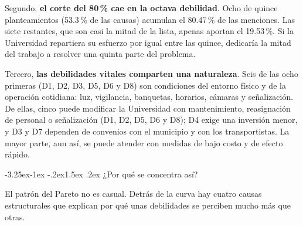 \documentclass[11pt,a4paper]{article}
\makeatletter
\renewcommand\subsection{\@startsection{subsection}{2}{\z@}%
  {-3.25ex\@plus -1ex \@minus -.2ex}{1.5ex \@plus .2ex}%
  {\normalfont\large\bfseries\color{uazblue!85!black}}}
\makeatother
\begin{document}
Segundo, \textbf{el corte del 80\,\% cae en la octava debilidad}. Ocho de
quince planteamientos (53.3\,\% de las causas) acumulan el 80.47\,\% de las
menciones. Las siete restantes, que son casi la mitad de la lista, apenas
aportan el 19.53\,\%. Si la Universidad repartiera su esfuerzo por igual entre
las quince, dedicaría la mitad del trabajo a resolver una quinta parte del
problema.

Tercero, \textbf{las debilidades vitales comparten una naturaleza}. Seis de las
ocho primeras (D1, D2, D3, D5, D6 y D8) son condiciones del entorno físico y de
la operación cotidiana: luz, vigilancia, banquetas, horarios, cámaras y
señalización. De ellas, cinco puede modificar la Universidad con mantenimiento,
reasignación de personal o señalización (D1, D2, D5, D6 y D8); D4 exige una
inversión menor, y D3 y D7 dependen de convenios con el municipio y con los
transportistas. La mayor parte, aun así, se puede atender con medidas de bajo
costo y de efecto rápido.

\subsection{¿Por qué se concentra así?}

El patrón del Pareto no es casual. Detrás de la curva hay cuatro causas
estructurales que explican por qué unas debilidades se perciben mucho más que
otras.
\end{document}
